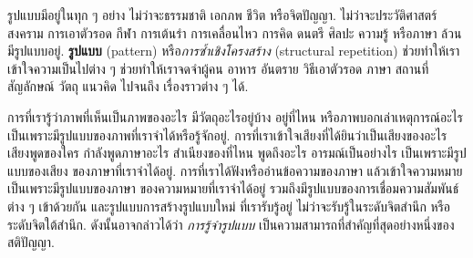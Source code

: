 \begin{Parallel}[c]{0.52\textwidth}{0.44\textwidth}
\end{Parallel}
\vspace{0.5cm}

รูปแบบมีอยู่ในทุก ๆ อย่าง ไม่ว่าจะธรรมชาติ เอกภพ ชีวิต หรือจิตปัญญา.
ไม่ว่าจะประวัติศาสตร์ สงคราม การเอาตัวรอด กีฬา การเต้นรำ การเคลื่อนไหว การคิด ดนตรี ศิลปะ ความรู้ หรือภาษา ล้วนมีรูปแบบอยู่.
\textbf{รูปแบบ} (pattern) หรือ\textit{การซ้ำเชิงโครงสร้าง} (structural repetition) ช่วยทำให้เราเข้าใจความเป็นไปต่าง ๆ ช่วยทำให้เราจดจำผู้คน อาหาร อันตราย วิธีเอาตัวรอด ภาษา สถานที่ สัญลักษณ์ วัตถุ แนวคิด ไปจนถึง เรื่องราวต่าง ๆ ได้.

การที่เรารู้ว่าภาพที่เห็นเป็นภาพของอะไร มีวัตถุอะไรอยู่บ้าง อยู่ที่ไหน หรือภาพบอกเล่าเหตุการณ์อะไร 
เป็นเพราะมีรูปแบบของภาพที่เราจำได้หรือรู้จักอยู่.
การที่เราเข้าใจเสียงที่ได้ยินว่าเป็นเสียงของอะไร เสียงพูดของใคร กำลังพูดภาษาอะไร สำเนียงของที่ไหน พูดถึงอะไร อารมณ์เป็นอย่างไร
เป็นเพราะมีรูปแบบของเสียง ของภาษาที่เราจำได้อยู่.
การที่เราได้ฟังหรืออ่านข้อความของภาษา แล้วเข้าใจความหมาย
เป็นเพราะมีรูปแบบของภาษา ของความหมายที่เราจำได้อยู่
รวมถึงมีรูปแบบของการเชื่อมความสัมพันธ์ต่าง ๆ เข้าด้วยกัน
และรูปแบบการสร้างรูปแบบใหม่ ที่เรารับรู้อยู่ ไม่ว่าจะรับรู้ในระดับจิตสำนึก หรือระดับจิตใต้สำนึก.
ดังนั้นอาจกล่าวได้ว่า \textit{การรู้จำรูปแบบ}  เป็นความสามารถที่สำคัญที่สุดอย่างหนึ่งของสติปัญญา.

